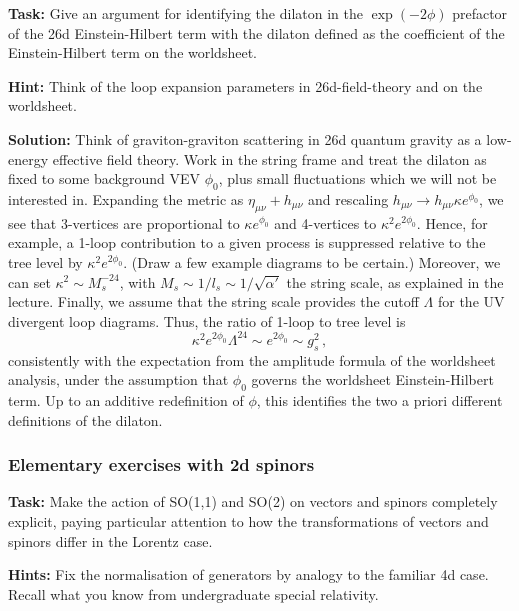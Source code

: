 \documentclass[12pt]{article}
\newcommand{\be}{\begin{equation}}
\newcommand{\ee}{\end{equation}}
\numberwithin{equation}{section}
\begin{document}
{\bf Task:} Give an argument for identifying the dilaton in the $\exp(-2\phi)$ prefactor of the 26d Einstein-Hilbert term with the dilaton defined as the coefficient of the Einstein-Hilbert term on the worldsheet.

\noindent
{\bf Hint:} Think of the loop expansion parameters in 26d-field-theory and on the worldsheet.

\noindent
{\bf Solution:} Think of graviton-graviton scattering in 26d quantum gravity as a low-energy effective field theory. Work in the string frame and treat the dilaton as fixed to some background VEV $\phi_0$, plus small fluctuations which we will not be interested in. Expanding the metric as $\eta_{\mu\nu}+h_{\mu\nu}$ and rescaling $h_{\mu\nu}\to h_{\mu\nu}\kappa e^{\phi_0}$, we see that 3-vertices are proportional to $\kappa e^{\phi_0}$ and 4-vertices to $\kappa^2 e^{2\phi_0}$. Hence, for example, a 1-loop contribution to a given process is suppressed relative to the tree level by $\kappa^2 e^{2\phi_0}$. (Draw a few example diagrams to be certain.) Moreover, we can set $\kappa^2\sim M_s^{-24}$, with $M_s\sim 1/l_s\sim 1/\sqrt{\alpha'}$ the string scale, as explained in the lecture. Finally, we assume that the string scale provides the cutoff $\Lambda$ for the UV divergent loop diagrams. Thus, the ratio of 1-loop to tree level is
\be
\kappa^2 e^{2\phi_0} \Lambda^{24} \sim e^{2\phi_0}\sim g_s^2\,,
\ee
consistently with the expectation from the amplitude formula of the worldsheet analysis, under the assumption that $\phi_0$ governs the worldsheet Einstein-Hilbert term. Up to an additive redefinition of $\phi$, this identifies the two a priori different definitions of the dilaton.






\subsubsection{Elementary exercises with 2d spinors}
\label{so2r}

{\bf Task:} Make the action of SO(1,1) and SO(2) on vectors and spinors completely explicit, paying particular attention to how the transformations of vectors and spinors differ in the Lorentz case.

\noindent
{\bf Hints:} Fix the normalisation of generators by analogy to the familiar 4d case. Recall what you know from undergraduate special relativity. 
\end{document}
